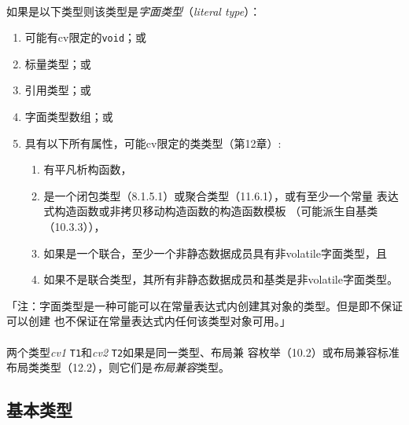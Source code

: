 \paragraph{}
如果是以下类型则该类型是\textit{字面类型}（\textit{literal type}）：
\begin{enumerate}
  \item{可能有cv限定的\texttt{void}；或}
  \item{标量类型；或}
  \item{引用类型；或}
  \item{字面类型数组；或}
  \item{具有以下所有属性，可能cv限定的类类型（第12章）:
      \begin{enumerate}
        \item{有平凡析构函数，}
        \item{是一个闭包类型（8.1.5.1）或聚合类型（11.6.1），或有至少一个常量
          表达式构造函数或非拷贝移动构造函数的构造函数模板
        （可能派生自基类（10.3.3）），}
        \item{如果是一个联合，至少一个非静态数据成员具有非volatile字面类型，且}
        \item{如果不是联合类型，其所有非静态数据成员和基类是非volatile字面类型。}
      \end{enumerate}
    }
\end{enumerate}
「注：字面类型是一种可能可以在常量表达式内创建其对象的类型。但是即不保证可以创建
也不保证在常量表达式内任何该类型对象可用。」

\paragraph{}
两个类型\textit{cv1} \texttt{T1}和\textit{cv2} \texttt{T2}如果是同一类型、布局兼
容枚举（10.2）或布局兼容标准布局类类型（12.2），则它们是\textit{布局兼容}类型。

\subsection{基本类型}
